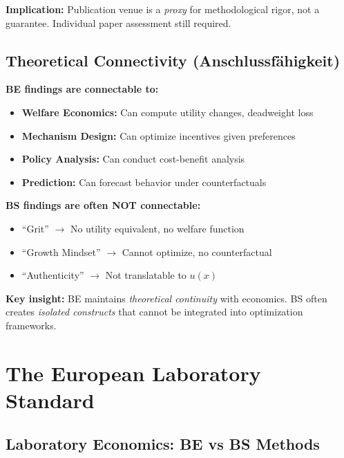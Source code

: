 \documentclass[11pt, a4paper]{article}
\begin{document}
\textbf{Implication:} Publication venue is a \textit{proxy} for methodological rigor, not a guarantee. Individual paper assessment still required.

\subsection{Theoretical Connectivity (Anschlussfähigkeit)}

\begin{tcolorbox}[colback=blue!5!white, colframe=blue!75!black,
    title=Why Theoretical Connectivity Matters]

\textbf{BE findings are connectable to:}
\begin{itemize}[nosep]
    \item \textbf{Welfare Economics:} Can compute utility changes, deadweight loss
    \item \textbf{Mechanism Design:} Can optimize incentives given preferences
    \item \textbf{Policy Analysis:} Can conduct cost-benefit analysis
    \item \textbf{Prediction:} Can forecast behavior under counterfactuals
\end{itemize}

\textbf{BS findings are often NOT connectable:}
\begin{itemize}[nosep]
    \item ``Grit'' $\to$ No utility equivalent, no welfare function
    \item ``Growth Mindset'' $\to$ Cannot optimize, no counterfactual
    \item ``Authenticity'' $\to$ Not translatable to $u(x)$
\end{itemize}

\textbf{Key insight:} BE maintains \textit{theoretical continuity} with economics. BS often creates \textit{isolated constructs} that cannot be integrated into optimization frameworks.

\end{tcolorbox}


\section{The European Laboratory Standard}
\label{sec:evd-european-lab}

\subsection{Laboratory Economics: BE vs BS Methods}
\end{document}
